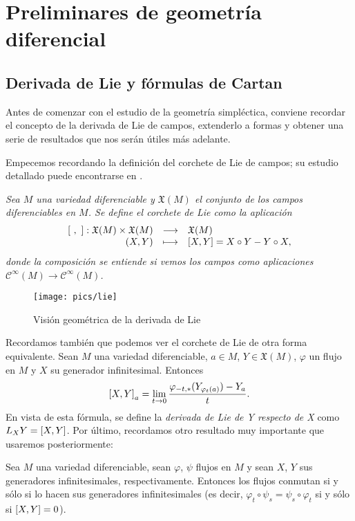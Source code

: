 \chapter{Preliminares de geometría diferencial}
\section{Derivada de Lie y fórmulas de Cartan}\label{sec:lie}

Antes de comenzar con el estudio de la geometría simpléctica, conviene recordar el concepto de la derivada de Lie de campos, extenderlo a formas y obtener una serie de resultados que nos serán útiles más adelante.

Empecemos recordando la definición del corchete de Lie de campos; su estudio detallado puede encontrarse en \cite{variedades}.

\begin{defn}
  \em
  Sea $M$ una variedad diferenciable y $\mathfrak{X}(M)$ el conjunto de los campos diferenciables en $M$. Se define el \emph{corchete de Lie} como la aplicación
  \begin{equation*}
    \begin{array}{rcl}
    \left[\ ,\ \right]: \mathfrak{X}(M) \times \mathfrak{X}(M) & \longrightarrow & \mathfrak{X}(M) \\
    (X,Y) & \longmapsto & \left[X,Y\right] = X \circ Y - Y \circ X,
  \end{array}
  \end{equation*}
  donde la composición se entiende si vemos los campos como aplicaciones $\mathscr{C}^{\infty}(M) \rightarrow \mathscr{C}^{\infty}(M)$.
\end{defn}
\begin{figure}[h]
  \centering
  \texttt{[image: pics/lie]}
  \caption{\small Visión geométrica de la derivada de Lie}
  \label{fig:lie}
\end{figure}
Recordamos también que podemos ver el corchete de Lie de otra forma equivalente. Sean $M$ una variedad diferenciable, $a \in M$, $Y \in \mathfrak{X}(M)$, $\varphi$ un flujo en $M$ y $X$ su generador infinitesimal. Entonces
\begin{equation*}
  \left[X,Y\right]_a= \lim_{t\rightarrow 0}\frac{\varphi_{-t,*}(Y_{\varphi_t(a)})-Y_a}{t}.
\end{equation*}
En vista de esta fórmula, se define la \emph{derivada de Lie de Y respecto de X} como $L_XY=\left[X,Y\right]$. 
Por último, recordamos otro resultado muy importante que usaremos posteriormente:
\begin{prop}
  Sea $M$ una variedad diferenciable, sean $\varphi$, $\psi$ flujos en $M$ y sean $X$, $Y$ sus generadores infinitesimales, respectivamente. Entonces los flujos conmutan si y sólo si lo hacen sus generadores infinitesimales (es decir, $\varphi_t \circ \psi_s = \psi_s \circ \varphi_t$ si y sólo si $\left[X,Y\right]=0$).
\end{prop} 

